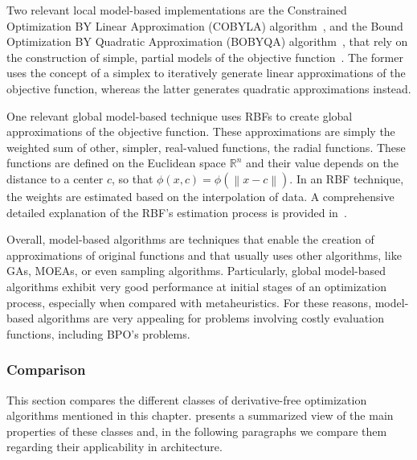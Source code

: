 	Two relevant local model-based implementations are the Constrained Optimization BY Linear Approximation (COBYLA) algorithm~\cite{Powell1994COBYLA}, and the Bound Optimization BY Quadratic Approximation (BOBYQA) algorithm~\cite{Powell2009BOBYQA}, that rely on the construction of simple, partial models of the objective function~\cite{Koziel2011}. The former uses the concept of a simplex to iteratively generate linear approximations of the objective function, whereas the latter generates quadratic approximations instead. 
	
	One relevant global model-based technique uses RBFs to create global approximations of the objective function. These approximations are simply the weighted sum of other, simpler, real-valued functions, the radial functions. These functions are defined on the Euclidean space $\mathbb{R}^n$ and their value depends on the distance to a center $c$, so that $\phi(x, c) = \phi(\left\lVert x-c \right\rVert)$. In an RBF technique, the weights are estimated based on the interpolation of data. A comprehensive detailed explanation of the RBF's estimation process is provided in~\cite{Forrester2009SBO}. 
	
	Overall, model-based algorithms are techniques that enable the creation of approximations of original functions and that usually uses other algorithms, like \acp{GA}, \acp{MOEA}, or even sampling algorithms. Particularly, global model-based algorithms exhibit very good performance at initial stages of an optimization process, especially when compared with metaheuristics. For these reasons, model-based algorithms are very appealing for problems involving costly evaluation functions, including \ac{BPO}'s problems.
	
	\subsubsection{Comparison}
	\label{ssec:comparisondfo}
	
	This section compares the different classes of derivative-free optimization algorithms mentioned in this chapter.  presents a summarized view of the main properties of these classes and, in the following paragraphs we compare them regarding their applicability in architecture. 

